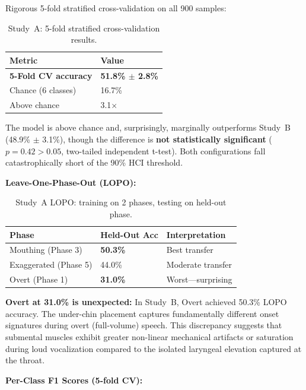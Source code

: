 \documentclass[11pt, a4paper]{article}
\begin{document}
Rigorous 5-fold stratified cross-validation on all 900 samples:

\begin{table}[ht]
\centering
\caption{Study~A: 5-fold stratified cross-validation results.}
\label{tab:testset}
\begin{tabular}{@{}ll@{}}
\toprule
Metric & Value \\
\midrule
\textbf{5-Fold CV accuracy} & \textbf{51.8\% $\pm$ 2.8\%} \\
Chance (6 classes) & 16.7\% \\
Above chance & 3.1$\times$ \\
\bottomrule
\end{tabular}
\end{table}

The model is above chance and, surprisingly, marginally outperforms Study~B (48.9\% $\pm$ 3.1\%), though the difference is \textbf{not statistically significant} ($p = 0.42 > 0.05$, two-tailed independent t-test). Both configurations fall catastrophically short of the 90\% HCI threshold.

\textbf{Leave-One-Phase-Out (LOPO):}

\begin{table}[ht]
\centering
\caption{Study~A LOPO: training on 2 phases, testing on held-out phase.}
\label{tab:lopo}
\begin{tabular}{@{}lll@{}}
\toprule
Phase & Held-Out Acc & Interpretation \\
\midrule
Mouthing (Phase 3) & \textbf{50.3\%} & Best transfer \\
Exaggerated (Phase 5) & 44.0\% & Moderate transfer \\
Overt (Phase 1) & \textbf{31.0\%} & Worst---surprising \\
\bottomrule
\end{tabular}
\end{table}

\textbf{Overt at 31.0\% is unexpected:} In Study~B, Overt achieved 50.3\% LOPO accuracy. The under-chin placement captures fundamentally different onset signatures during overt (full-volume) speech. This discrepancy suggests that submental muscles exhibit greater non-linear mechanical artifacts or saturation during loud vocalization compared to the isolated laryngeal elevation captured at the throat.

\textbf{Per-Class F1 Scores (5-fold CV):}
\end{document}
